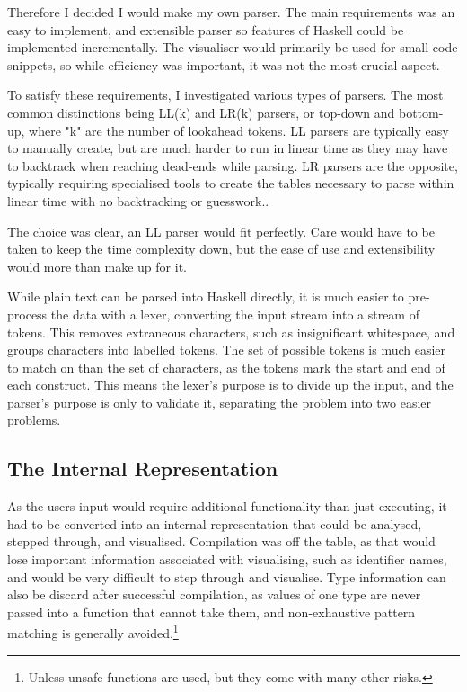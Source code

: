 Therefore I decided I would make my own parser. The main requirements was an easy to implement, and extensible parser so features of Haskell could be implemented incrementally. The visualiser would primarily be used for small code snippets, so while efficiency was important, it was not the most crucial aspect.

To satisfy these requirements, I investigated various types of parsers. The most common distinctions being LL(k) and LR(k) parsers, or top-down and bottom-up, where "k" are the number of lookahead tokens. LL parsers are typically easy to manually create, but are much harder to run in linear time as they may have to backtrack when reaching dead-ends while parsing. LR parsers are the opposite, typically requiring specialised tools to create the tables necessary to parse within linear time with no backtracking or guesswork.\cite{Syme2007}.

The choice was clear, an LL parser would fit perfectly. Care would have to be taken to keep the time complexity down, but the ease of use and extensibility would more than make up for it.

While plain text can be parsed into Haskell directly, it is much easier to pre-process the data with a lexer, converting the input stream into a stream of tokens. This removes extraneous characters, such as insignificant whitespace, and groups characters into labelled tokens. The set of possible tokens is much easier to match on than the set of characters, as the tokens mark the start and end of each construct. This means the lexer's purpose is to divide up the input, and the parser's purpose is only to validate it, separating the problem into two easier problems.



\subsection{The Internal Representation}
As the users input would require additional functionality than just executing, it had to be converted into an internal representation that could be analysed, stepped through, and visualised. Compilation was off the table, as that would lose important information associated with visualising, such as identifier names, and would be very difficult to step through and visualise. Type information can also be discard after successful compilation, as values of one type are never passed into a function that cannot take them, and non-exhaustive pattern matching is generally avoided.\footnote{Unless unsafe functions are used, but they come with many other risks.}

